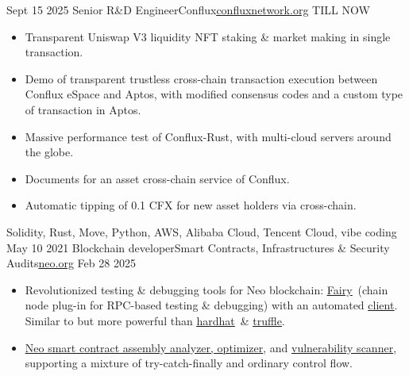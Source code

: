 %
%
%
\begin{experiences}
 \experience
    {Sept 15 2025}     {Senior R\&D Engineer}{Conflux}{\href{https://confluxnetwork.org}{\underline{confluxnetwork.org}}}
    {TILL NOW}    {
        \begin{itemize}
            \item Transparent Uniswap V3 liquidity NFT staking \& market making in single transaction.
            \item Demo of transparent trustless cross-chain transaction execution between Conflux eSpace and Aptos, with modified consensus codes and a custom type of transaction in Aptos.
            \item Massive performance test of Conflux-Rust, with multi-cloud servers around the globe.
            \item Documents for an asset cross-chain service of Conflux.
            \item Automatic tipping of 0.1 CFX for new asset holders via cross-chain.
        \end{itemize}
                    }
                    {Solidity, Rust, Move, Python, AWS, Alibaba Cloud, Tencent Cloud, vibe coding}
 \emptySeparator
 \experience
    {May 10 2021}     {Blockchain developer}{Smart Contracts, Infrastructures \& Security Audits}{\href{https://neo.org}{\underline{neo.org}}}
    {Feb 28 2025}    {
                      \begin{itemize}
                        \item Revolutionized testing \& debugging tools for Neo blockchain: \href{https://github.com/Hecate2/neo-fairy-test/}{\underline{Fairy}}\, (chain node plug-in for RPC-based testing \& debugging) with an automated \href{https://github.com/Hecate2/neo-fairy-client/}{\underline{client}}. Similar to but more powerful than \href{https://github.com/NomicFoundation/hardhat}{\underline{hardhat}}\, \& \href{https://github.com/trufflesuite/truffle}{\underline{truffle}}.
                        \item \href{https://github.com/neo-project/neo-devpack-dotnet/tree/master/src/Neo.Compiler.CSharp/Optimizer}{\underline{Neo smart contract assembly analyzer, optimizer}}, and \href{https://github.com/neo-project/neo-devpack-dotnet/tree/master/src/Neo.Compiler.CSharp/SecurityAnalyzer}{\underline{vulnerability scanner}}, supporting a mixture of try-catch-finally and ordinary control flow.

\end{itemize}}
\end{experiences}
